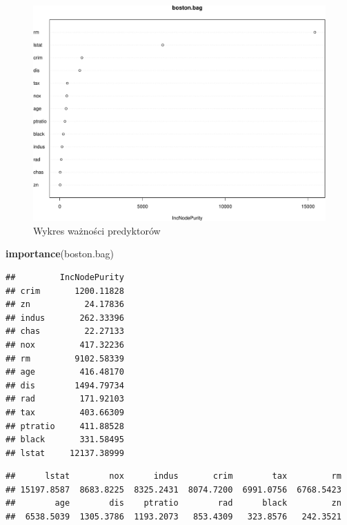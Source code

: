 \documentclass[]{book}
\newenvironment{Shaded}{\begin{snugshade}}{\end{snugshade}}
\newcommand{\KeywordTok}[1]{\textcolor[rgb]{0.13,0.29,0.53}{\textbf{#1}}}
\newcommand{\NormalTok}[1]{#1}
\newcommand{\OperatorTok}[1]{\textcolor[rgb]{0.81,0.36,0.00}{\textbf{#1}}}
\theoremstyle{plain}
\theoremstyle{definition}
\theoremstyle{definition}
\theoremstyle{definition}
\theoremstyle{definition}
\theoremstyle{remark}
\begin{document}
\begin{figure}
\centering
\includegraphics{EksploracjaDanych_files/figure-latex/unnamed-chunk-38-1.pdf}
\caption{\label{fig:unnamed-chunk-38}Wykres ważności predyktorów}
\end{figure}

\begin{Shaded}
\begin{Highlighting}[]
\KeywordTok{importance}\NormalTok{(boston.bag)}
\end{Highlighting}
\end{Shaded}

\begin{verbatim}
##         IncNodePurity
## crim       1200.11828
## zn           24.17836
## indus       262.33396
## chas         22.27133
## nox         417.32236
## rm         9102.58339
## age         416.48170
## dis        1494.79734
## rad         171.92103
## tax         403.66309
## ptratio     411.88528
## black       331.58495
## lstat     12137.38999
\end{verbatim}

\begin{Shaded}
\end{Shaded}

\begin{verbatim}
##      lstat        nox      indus       crim        tax         rm 
## 15197.8587  8683.8225  8325.2431  8074.7200  6991.0756  6768.5423 
##        age        dis    ptratio        rad      black         zn 
##  6538.5039  1305.3786  1193.2073   853.4309   323.8576   242.3521
\end{verbatim}
\end{document}
